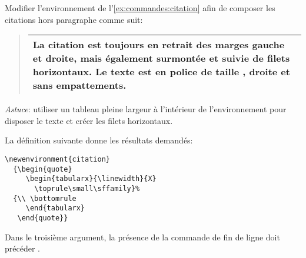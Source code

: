 \begin{exercice}
  Modifier l'environnement  de
  l'\autoref{ex:commandes:citation} afin de composer les citations
  hors paragraphe comme suit:
  \begin{quote}
    \begin{tabularx}{\linewidth}{X}
      \toprule
      \small\sffamily%
      La citation est toujours en retrait des marges gauche et droite,
      mais également surmontée et suivie de filets horizontaux. Le
      texte est en police de taille \cmdprint{\small}, droite et sans
      empattements. \\
      \bottomrule
    \end{tabularx}
  \end{quote}
  \emph{Astuce}: utiliser un tableau pleine largeur à l'intérieur de
  l'environnement  pour disposer le texte et créer les
  filets horizontaux.
  \begin{sol}
    La définition suivante donne les résultats demandés:
\begin{lstlisting}
\newenvironment{citation}
  {\begin{quote}
     \begin{tabularx}{\linewidth}{X}
       \toprule\small\sffamily}%
  {\\ \bottomrule
     \end{tabularx}
   \end{quote}}
\end{lstlisting}
    Dans le troisième argument, la présence de la commande de fin de
    ligne {\pixbsbs} doit précéder \cmdprint{\bottomrule}.
  \end{sol}
\end{exercice}


